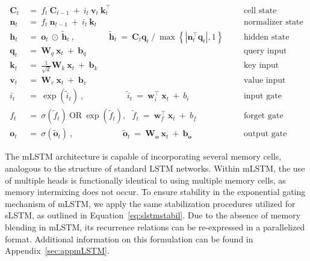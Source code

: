 \begin{align}
\label{eq:mlstm_recurrent_begin}
\mathbf{C}_t \ &= \  f_t \ \mathbf{C}_{t-1} \ + \ 
  i_t \ \mathbf{v}_t \ \mathbf{k}_t^\top & &  &\text{cell state} \\
\mathbf{n}_t \ &= \  f_t \ \mathbf{n}_{t-1} \ + \ 
  i_t \ \mathbf{k}_t & &  &\text{normalizer state} \\
\mathbf{h}_t  \ &= \ \mathbf{o}_t \ \odot \ \tilde{\mathbf{h}}_t
\ , \qquad \qquad 
\tilde{\mathbf{h}}_t \ = \   \mathbf{C}_t \mathbf{q}_t \ / \ 
  \max \left\{ |\mathbf{n}_t^\top \mathbf{q}_t|, 1 \right\} 
   &&&\text{hidden state} \\
\mathbf{q}_t \ &= \ \mathbf{W}_q \ \mathbf{x}_t \ + \ \mathbf{b}_q  & &  &\text{query input} \\
\mathbf{k}_t \ &= \ \frac{1}{\sqrt{d}} \mathbf{W}_k \ \mathbf{x}_t \ + \ \mathbf{b}_k  & &  &\text{key input} \\
\mathbf{v}_t \ &= \ \mathbf{W}_v \ \mathbf{x}_t \ + \ \mathbf{b}_v  & &  &\text{value input} \\
i_t \ &= \ \!\exp \!  \! \left( \tilde{i}_t  \right) \ , 
 \qquad \qquad \ \ \ \ \,
  \tilde{i}_t \ = \ \mathbf{w}^\top_{i} \ \mathbf{x}_t \ + \  b_{i} \ \ \ 
  &&&\text{input gate} \\
f_t \ &= \ \sigma \!  \left(  \tilde{f}_t \right) \ \text{OR} \ \!\exp \!  \! \left(  \tilde{f}_t \right) , \ \ \: \!
\tilde{f}_t \ = \ \mathbf{w}^\top_{f} \ \mathbf{x}_t  \ + \
  b_{f}
  &&& \text{forget gate} \\
\label{eq:mlstm_recurrent_end}
\mathbf{o}_t \ &= \ \sigma \left( \tilde{\mathbf{o}}_t \right) \ , \qquad \qquad \quad \ \ \ \,
  \tilde{\mathbf{o}}_t  \ = \ \mathbf{W}_{\mathbf{o}} \ \mathbf{x}_t \ + \
  \mathbf{b}_{\mathbf{o}}
  &&&\text{output gate} 
\end{align}

The mLSTM architecture is capable of incorporating several memory cells, analogous to the structure of standard LSTM networks. Within mLSTM, the use of multiple heads is functionally identical to using multiple memory cells, as memory intermixing does not occur. To ensure stability in the exponential gating mechanism of mLSTM, we apply the same stabilization procedures utilized for sLSTM, as outlined in Equation~\ref{eq:slstmstabil}. 
Due to the absence of memory blending in mLSTM, its recurrence relations can be re-expressed in a parallelized format. Additional information on this formulation can be found in Appendix~\ref{sec:appmLSTM}.

